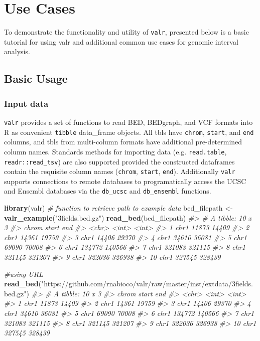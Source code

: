 \documentclass[9pt,a4paper]{extarticle}
\renewcommand{\KeywordTok}[1]{\textbf{{#1}}}
\renewcommand{\StringTok}[1]{\textcolor[rgb]{0.87,0.00,0.00}{{#1}}}
\renewcommand{\CommentTok}[1]{\textcolor[rgb]{0.50,0.50,0.50}{\textit{{#1}}}}
\renewcommand{\NormalTok}[1]{{#1}}
\begin{document}
\section*{Use Cases}
To demonstrate the functionality and utility of \texttt{valr}, presented below is a basic tutorial for using valr and additional common use cases for genomic interval analysis.

\subsection*{Basic Usage}

\subsubsection*{Input data}\label{input-data}

\texttt{valr} provides a set of functions to read BED, BEDgraph, and VCF formats into R as convenient \texttt{tibble} data\_frame objects. All tbls have \texttt{chrom}, \texttt{start}, and \texttt{end} columns, and tbls from multi-column formats have additional pre-determined column names. Standards methods for importing data (e.g. \texttt{read.table}, \texttt{readr::read\_tsv}) are also supported provided the constructed dataframes contain the requisite column names (\texttt{chrom}, \texttt{start}, \texttt{end}). Additionally \texttt{valr} supports connections to remote databases to programatically access the UCSC and Ensembl databases via the \texttt{db\_ucsc} and \texttt{db\_ensembl} functions.

\begin{Highlighting}[]
\KeywordTok{library}\NormalTok{(valr)}
\CommentTok{# function to retrieve path to example data}
\NormalTok{bed_filepath <-}\StringTok{ }\KeywordTok{valr_example}\NormalTok{(}\StringTok{"3fields.bed.gz"}\NormalTok{) }
\KeywordTok{read_bed}\NormalTok{(bed_filepath) }
\CommentTok{#> # A tibble: 10 x 3}
\CommentTok{#>    chrom  start    end}
\CommentTok{#>    <chr>  <int>  <int>}
\CommentTok{#>  1  chr1  11873  14409}
\CommentTok{#>  2  chr1  14361  19759}
\CommentTok{#>  3  chr1  14406  29370}
\CommentTok{#>  4  chr1  34610  36081}
\CommentTok{#>  5  chr1  69090  70008}
\CommentTok{#>  6  chr1 134772 140566}
\CommentTok{#>  7  chr1 321083 321115}
\CommentTok{#>  8  chr1 321145 321207}
\CommentTok{#>  9  chr1 322036 326938}
\CommentTok{#> 10  chr1 327545 328439}

\CommentTok{#using URL}
\KeywordTok{read_bed}\NormalTok{(}\StringTok{"https://github.com/rnabioco/valr/raw/master/inst/extdata/3fields.bed.gz"}\NormalTok{)}
\CommentTok{#> # A tibble: 10 x 3}
\CommentTok{#>    chrom  start    end}
\CommentTok{#>    <chr>  <int>  <int>}
\CommentTok{#>  1  chr1  11873  14409}
\CommentTok{#>  2  chr1  14361  19759}
\CommentTok{#>  3  chr1  14406  29370}
\CommentTok{#>  4  chr1  34610  36081}
\CommentTok{#>  5  chr1  69090  70008}
\CommentTok{#>  6  chr1 134772 140566}
\CommentTok{#>  7  chr1 321083 321115}
\CommentTok{#>  8  chr1 321145 321207}
\CommentTok{#>  9  chr1 322036 326938}
\CommentTok{#> 10  chr1 327545 328439}
\end{Highlighting}
\end{document}
